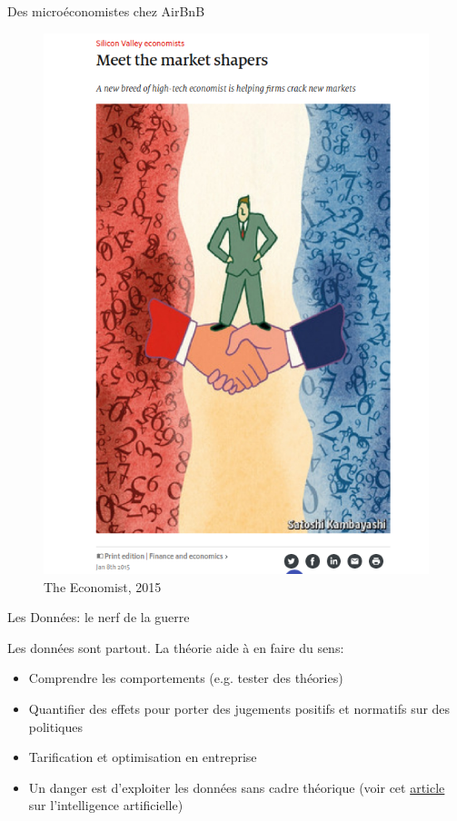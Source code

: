 \documentclass[handout]{beamer}
\begin{document}
\begin{frame}{Des microéconomistes chez AirBnB}

\begin{figure}
	\includegraphics[scale=0.25]{AI.png}
	\caption{The Economist, 2015}
\end{figure}

\end{frame}




\begin{frame}{Les Données: le nerf de la guerre}

Les données sont partout. La théorie aide à en faire du sens:

  \begin{itemize}
  \item<1-> Comprendre les comportements (e.g. tester des théories)
  \item<2-> Quantifier des effets pour porter des jugements positifs et normatifs sur des politiques
  \item<3-> Tarification et optimisation en entreprise
  \item<4-> Un danger est d'exploiter les données sans cadre théorique (voir cet \href{https://www.quantamagazine.org/to-build-truly-intelligent-machines-teach-them-cause-and-effect-20180515/}{article} sur l'intelligence artificielle)
  \end{itemize}

\end{frame}
\end{document}
